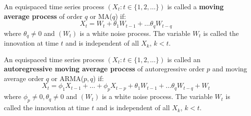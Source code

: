 \begin{example}
    An equispaced time series process $(X_t: t \in \{1,2, \dots\})$ is called a
    \textbf{moving average process} of order $q$ or MA($q$) if:
    \[
        X_t = W_t + \theta_1 W_{t-1} + \dots \theta_q W_{t-q}
    \]
    where $\theta_q \neq 0$ and $(W_t)$ is a white noise process. The variable $W_t$
    is called the innovation at time $t$ and is independent of all $X_k$, $k < t$.
\end{example}

\begin{example}
    An equispaced time series process $(X_t: t \in \{1,2, \dots\})$ is called an
    \textbf{autoregressive moving average process} of autoregressive order $p$ and
    moving average order $q$ or ARMA($p,q$) if:
    \[
        X_t =  \phi_1 X_{t-1} + \dots + \phi_p X_{t-p} + \theta_1 W_{t-1} + \dots
        \theta_q W_{t-q} + W_t
    \]
    where $\phi_p \neq 0, \theta_q \neq 0$ and $(W_t)$ is a white noise process.
    The variable $W_t$ is called the innovation at time $t$ and is independent of all
    $X_k$, $k < t$.
\end{example}



